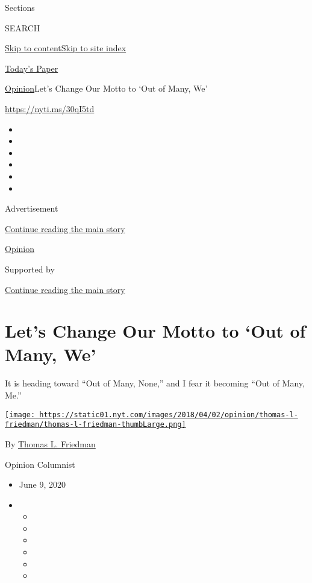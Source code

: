 Sections

SEARCH

\protect\hyperlink{site-content}{Skip to
content}\protect\hyperlink{site-index}{Skip to site index}

\href{https://myaccount.nytimes.com/auth/login?response_type=cookie\&client_id=vi}{}

\href{https://www.nytimes.com/section/todayspaper}{Today's Paper}

\href{/section/opinion}{Opinion}\textbar{}Let's Change Our Motto to `Out
of Many, We'

\href{https://nyti.ms/30qI5td}{https://nyti.ms/30qI5td}

\begin{itemize}
\item
\item
\item
\item
\item
\item
\end{itemize}

Advertisement

\protect\hyperlink{after-top}{Continue reading the main story}

\href{/section/opinion}{Opinion}

Supported by

\protect\hyperlink{after-sponsor}{Continue reading the main story}

\hypertarget{lets-change-our-motto-to-out-of-many-we}{%
\section{Let's Change Our Motto to `Out of Many,
We'}\label{lets-change-our-motto-to-out-of-many-we}}

It is heading toward ``Out of Many, None,'' and I fear it becoming ``Out
of Many, Me.''

\href{https://www.nytimes.com/by/thomas-l-friedman}{\texttt{[image: https://static01.nyt.com/images/2018/04/02/opinion/thomas-l-friedman/thomas-l-friedman-thumbLarge.png]}}

By \href{https://www.nytimes.com/by/thomas-l-friedman}{Thomas L.
Friedman}

Opinion Columnist

\begin{itemize}
\item
  June 9, 2020
\item
  \begin{itemize}
  \item
  \item
  \item
  \item
  \item
  \item
  \end{itemize}
\end{itemize}

